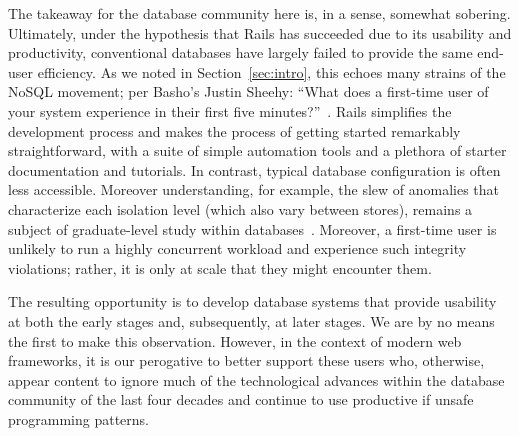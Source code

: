 The takeaway for the database community here is, in a sense, somewhat
sobering. Ultimately, under the hypothesis that Rails has succeeded
due to its usability and productivity, conventional databases have
largely failed to provide the same end-user efficiency. As we noted in
Section~\ref{sec:intro}, this echoes many strains of the NoSQL
movement; per Basho's Justin Sheehy: ``What does a first-time user of
your system experience in their first five
minutes?''~\cite{marcus-talk}. Rails simplifies the development
process and makes the process of getting started remarkably
straightforward, with a suite of simple automation tools and a
plethora of starter documentation and tutorials. In contrast, typical
database configuration is often less accessible. Moreover
understanding, for example, the slew of anomalies that characterize
each isolation level (which also vary between stores), remains a
subject of graduate-level study within
databases~\cite{adya-isolation,hat-vldb}. Moreover, a first-time user
is unlikely to run a highly concurrent workload and experience such
integrity violations; rather, it is only at scale that they might
encounter them.

The resulting opportunity is to develop database systems that provide
usability at both the early stages and, subsequently, at later
stages. We are by no means the first to make this
observation. However, in the context of modern web frameworks, it is
our perogative to better support these users who, otherwise, appear
content to ignore much of the technological advances within the
database community of the last four decades and continue to use
productive if unsafe programming patterns.




